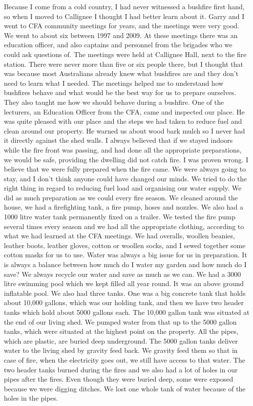 \documentclass[a4paper]{article}
\begin{document}
        Because I come from a cold country, I had never witnessed a bushfire first hand, so when I moved to Callignee I thought I had better learn about it. Garry and I went to CFA community meetings for years, and the meetings were very good. We went to about six between 1997 and 2009.
        At these meetings there was an education officer, and also captains and personnel from the brigades who we could ask questions of. The meetings were held at Callignee Hall, next to the fire station. There were never more than five or six people there, but I thought that was because most Australians already knew what bushfires are and they don't need to learn what I needed.
        The meetings helped me to understand how bushfires behave and what would be the best way for us to prepare ourselves. They also taught me how we should behave during a bushfire. One of the lecturers, an Education Officer from the CFA, came and inspected our place. He was quite pleased with our place and the steps we had taken to reduce fuel and clean around our property. He warned us about wood bark mulch so I never had it directly against the shed walls.
        I always believed that if we stayed indoors while the fire front was passing, and had done all the appropriate preparations, we would be safe, providing the dwelling did not catch fire. I was proven wrong. I believe that we were fully prepared when the fire came. We were always going to stay, and I don't think anyone could have changed our minds.
        We tried to do the right thing in regard to reducing fuel load and organising our water supply. We did as much preparation as we could every fire season. We cleaned around the house, we had a firefighting tank, a fire pump, hoses and nozzles. We also had a 1000 litre water tank permanently fixed on a trailer.
        We tested the fire pump several times every season and we had all the appropriate clothing, according to what we had learned at the CFA meetings. We had overalls, woollen beanies, leather boots, leather gloves, cotton or woollen socks, and I sewed together some cotton masks for us to use.
        Water was always a big issue for us in preparation. It is always a balance between how much do I water my garden and how much do I save? We always recycle our water and save as much as we can. We had a 3000 litre swimming pool which we kept filled all year round. It was an above ground inflatable pool. We also had three tanks. One was a big concrete tank that holds about 10,000 gallons, which was our holding tank, and then we have two header tanks which hold about 5000 gallons each. The 10,000 gallon tank was situated at the end of our living shed. We pumped water from that up to the 5000 gallon tanks, which were situated at the highest point on the property. All the pipes, which are plastic, are buried deep underground. The 5000 gallon tanks deliver water to the living shed by gravity feed back. We gravity feed them so that in case of fire, when the electricity goes out, we still have access to that water. The two header tanks burned during the fires and we also had a lot of holes in our pipes after the fires. Even though they were buried deep, some were exposed because we were digging ditches. We lost one whole tank of water because of the holes in the pipes.
\end{document}
